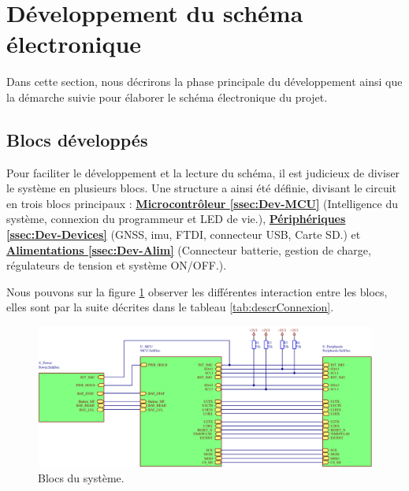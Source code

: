 \section{Développement du schéma électronique} \label{sec:Dev-Schematique}
Dans cette section, nous décrirons la phase principale du développement ainsi que la démarche suivie pour élaborer le schéma électronique du projet.

\subsection{Blocs développés} \label{ssec:Dev-blocs}
Pour faciliter le développement et la lecture du schéma, il est judicieux de diviser le système en plusieurs blocs. Une structure a ainsi été définie, divisant le circuit en trois blocs principaux : \hyperref[ssec:Dev-MCU]{\textbf{Microcontrôleur \ref{ssec:Dev-MCU}}} (Intelligence du système, connexion du programmeur et LED de vie.), \hyperref[ssec:Dev-Devices]{\textbf{Périphériques \ref{ssec:Dev-Devices}}} (\gls{GNSS}, \gls{imu}, \gls{FTDI}, connecteur USB, Carte SD.) et \hyperref[ssec:Dev-Alim]{\textbf{Alimentations \ref{ssec:Dev-Alim}}} (Connecteur batterie, gestion de charge, régulateurs de tension et système ON/OFF.).

Nous pouvons sur la figure \ref{fig:blocs} observer les différentes interaction entre les blocs, elles sont par la suite décrites dans le tableau \ref{tab:descrConnexion}.

\begin{figure}[h]
	\centering
	\includegraphics[width=.85\linewidth]{../figures/etude/sch/BLOCS}
	\caption{Blocs du système.}
	\label{fig:blocs}
\end{figure}

